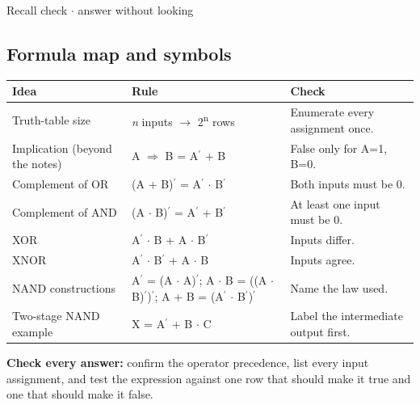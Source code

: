\documentclass[11pt]{article}
\begin{document}
\begin{keepsection}
\begin{keepsection}
\begin{recallbox}{Recall check \ensuremath{\cdot} answer without looking}
\end{recallbox}
\end{keepsection}
\end{keepsection}

\begin{keepsection}
\section{Formula map and symbols}

\begin{center}\small\begin{tabularx}{\linewidth}{>{\raggedright\arraybackslash}X>{\raggedright\arraybackslash}X>{\raggedright\arraybackslash}X}\toprule
\textbf{Idea} & \textbf{Rule} & \textbf{Check} \\ \midrule
Truth-table size & \textit{n} inputs \ensuremath{\to} 2\textsuperscript{n} rows & Enumerate every assignment once. \\
Implication (beyond the notes) & A \ensuremath{\Rightarrow} B = A\ensuremath{{}^{\prime}} + B & False only for A=1, B=0. \\
Complement of OR & (A + B)\ensuremath{{}^{\prime}} = A\ensuremath{{}^{\prime}} \ensuremath{\cdot} B\ensuremath{{}^{\prime}} & Both inputs must be 0. \\
Complement of AND & (A \ensuremath{\cdot} B)\ensuremath{{}^{\prime}} = A\ensuremath{{}^{\prime}} + B\ensuremath{{}^{\prime}} & At least one input must be 0. \\
XOR & A\ensuremath{{}^{\prime}} \ensuremath{\cdot} B + A \ensuremath{\cdot} B\ensuremath{{}^{\prime}} & Inputs differ. \\
XNOR & A\ensuremath{{}^{\prime}} \ensuremath{\cdot} B\ensuremath{{}^{\prime}} + A \ensuremath{\cdot} B & Inputs agree. \\
NAND constructions & A\ensuremath{{}^{\prime}} = (A \ensuremath{\cdot} A)\ensuremath{{}^{\prime}}; A \ensuremath{\cdot} B = ((A \ensuremath{\cdot} B)\ensuremath{{}^{\prime}})\ensuremath{{}^{\prime}}; A + B = (A\ensuremath{{}^{\prime}} \ensuremath{\cdot} B\ensuremath{{}^{\prime}})\ensuremath{{}^{\prime}} & Name the law used. \\
Two-stage NAND example & X = A\ensuremath{{}^{\prime}} + B \ensuremath{\cdot} C & Label the intermediate output first. \\
\bottomrule\end{tabularx}\end{center}

\begin{notebox}\textbf{Check every answer:} confirm the operator precedence, list every input assignment, and test the expression against one row that should make it true and one that should make it false.\end{notebox}
\end{keepsection}
\end{document}
